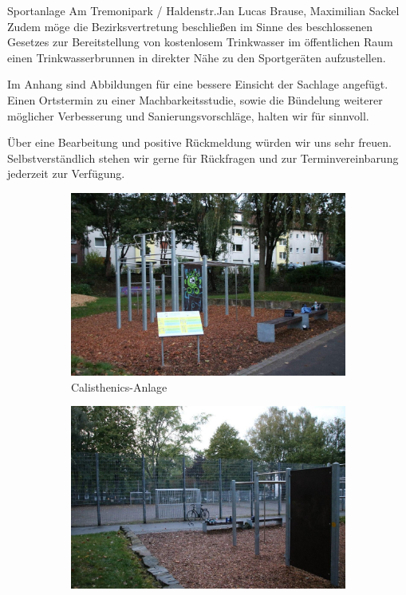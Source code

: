 \documentclass{../../templates/amendment}
\begin{document}
\begin{boxed}{Sportanlage Am Tremonipark / Haldenstr.}{Jan Lucas Brause, Maximilian Sackel}
    Zudem möge die Bezirksvertretung beschließen im Sinne des beschlossenen Gesetzes zur Bereitstellung von kostenlosem Trinkwasser im öffentlichen Raum einen Trinkwasserbrunnen in direkter Nähe zu den Sportgeräten aufzustellen. %

    Im Anhang sind Abbildungen für eine bessere Einsicht der Sachlage angefügt.
    Einen Ortstermin zu einer Machbarkeitsstudie, sowie die Bündelung weiterer möglicher Verbesserung und Sanierungsvorschläge, halten wir für sinnvoll.

    Über eine Bearbeitung und positive Rückmeldung würden wir uns sehr freuen.
    Selbstverständlich stehen wir gerne für Rückfragen und zur Terminvereinbarung jederzeit zur Verfügung.

    \begin{figure}[htpb]
        \centering
        \begin{subfigure}[]{0.49\textwidth}
            \begin{center}
                \includegraphics[width=\linewidth]{pictures/photo1.jpg}
                \caption{Calisthenics-Anlage}%
            \end{center}
        \end{subfigure}
        \begin{subfigure}[]{0.49\textwidth}
            \begin{center}
                \includegraphics[width=\linewidth]{pictures/photo3.jpg}

\end{center}
\end{subfigure}
\end{figure}
\end{boxed}
\end{document}
